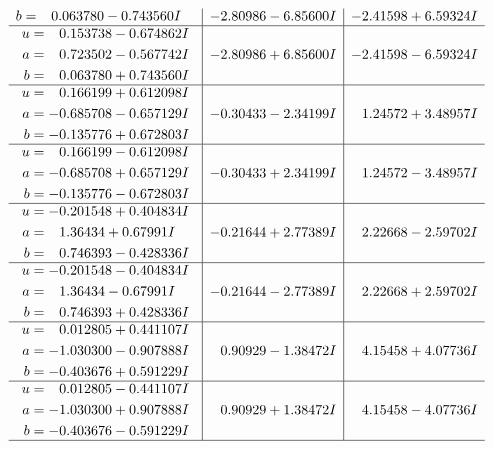 \documentclass[1p]{elsarticle_modified}
\theoremstyle{definition}
\begin{document}
$$\begin{array}{c|c|c}
\begin{aligned}
b &= \phantom{-}0.063780 - 0.743560 I\end{aligned}
 & -2.80986 - 6.85600 I & -2.41598 + 6.59324 I \\ \hline\begin{aligned}
u &= \phantom{-}0.153738 - 0.674862 I \\
a &= \phantom{-}0.723502 - 0.567742 I \\
b &= \phantom{-}0.063780 + 0.743560 I\end{aligned}
 & -2.80986 + 6.85600 I & -2.41598 - 6.59324 I \\ \hline\begin{aligned}
u &= \phantom{-}0.166199 + 0.612098 I \\
a &= -0.685708 - 0.657129 I \\
b &= -0.135776 + 0.672803 I\end{aligned}
 & -0.30433 - 2.34199 I & \phantom{-}1.24572 + 3.48957 I \\ \hline\begin{aligned}
u &= \phantom{-}0.166199 - 0.612098 I \\
a &= -0.685708 + 0.657129 I \\
b &= -0.135776 - 0.672803 I\end{aligned}
 & -0.30433 + 2.34199 I & \phantom{-}1.24572 - 3.48957 I \\ \hline\begin{aligned}
u &= -0.201548 + 0.404834 I \\
a &= \phantom{-}1.36434 + 0.67991 I \\
b &= \phantom{-}0.746393 - 0.428336 I\end{aligned}
 & -0.21644 + 2.77389 I & \phantom{-}2.22668 - 2.59702 I \\ \hline\begin{aligned}
u &= -0.201548 - 0.404834 I \\
a &= \phantom{-}1.36434 - 0.67991 I \\
b &= \phantom{-}0.746393 + 0.428336 I\end{aligned}
 & -0.21644 - 2.77389 I & \phantom{-}2.22668 + 2.59702 I \\ \hline\begin{aligned}
u &= \phantom{-}0.012805 + 0.441107 I \\
a &= -1.030300 - 0.907888 I \\
b &= -0.403676 + 0.591229 I\end{aligned}
 & \phantom{-}0.90929 - 1.38472 I & \phantom{-}4.15458 + 4.07736 I \\ \hline\begin{aligned}
u &= \phantom{-}0.012805 - 0.441107 I \\
a &= -1.030300 + 0.907888 I \\
b &= -0.403676 - 0.591229 I\end{aligned}
 & \phantom{-}0.90929 + 1.38472 I & \phantom{-}4.15458 - 4.07736 I\\
 \hline 
 \end{array}$$\newpage\newpage\renewcommand{\arraystretch}{1}
\end{document}
